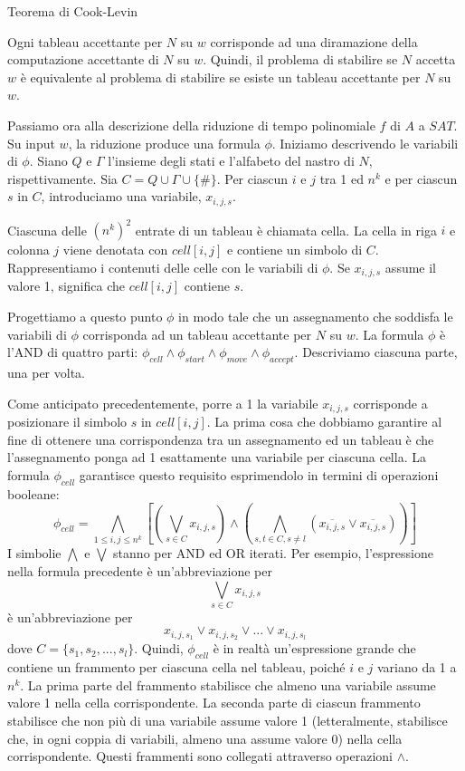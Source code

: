 \begin{Thm}{Teorema di Cook-Levin}{}
\begin{demonstration}
Ogni tableau accettante per $N$ su $w$ corrisponde ad una diramazione della computazione accettante di $N$ su $w$. Quindi, il problema di stabilire se $N$ accetta $w$ è equivalente al problema di stabilire se esiste un tableau accettante per $N$ su $w$.

Passiamo ora alla descrizione della riduzione di tempo polinomiale $f$ di $A$ a $SAT$. Su input $w$, la riduzione produce una formula $\phi$. Iniziamo descrivendo le variabili di $\phi$. Siano $Q$ e $\Gamma$ l'insieme degli stati e l'alfabeto del nastro di $N$, rispettivamente. Sia $C = Q\cup\Gamma\cup\{\#\}$. Per ciascun $i$ e $j$ tra 1 ed $n^k$ e per ciascun $s$ in $C$, introduciamo una variabile, $x_{i,j,s}$.

Ciascuna delle $(n ^ k) ^ 2$ entrate di un tableau è chiamata cella. La cella in riga $i$ e colonna $j$ viene denotata con $cell[i, j]$ e contiene un simbolo di $C$. Rappresentiamo i contenuti delle celle con le variabili di $\phi$. Se $x_{i,j,s}$ assume il valore 1, significa che $cell[i, j]$ contiene $s$.

Progettiamo a questo punto $\phi$ in modo tale che un assegnamento che soddisfa le variabili di $\phi$ corrisponda ad un tableau accettante per $N$ su $w$. La formula $\phi$ è l'AND di quattro parti: $\phi_{cell}\land\phi_{start}\land\phi_{move}\land\phi_{accept}$. Descriviamo ciascuna parte, una per volta.

Come anticipato precedentemente, porre a 1 la variabile $x_{i,j,s}$ corrisponde a posizionare il simbolo $s$ in $cell[i, j]$. La prima cosa che dobbiamo garantire al fine di ottenere una corrispondenza tra un assegnamento ed un tableau è che l'assegnamento ponga ad 1 esattamente una variabile per ciascuna cella. La formula $\phi_{cell}$ garantisce questo requisito esprimendolo in termini di operazioni booleane: 
\begin{equation*}
\phi_{cell} = \bigwedge_{1\leq i ,j\leq n^k} \left[\left(\bigvee_{s\in C} x_{i,j,s}\right)\land\left(\bigwedge_{s,t\in C, s\neq l} (\overline{x_{i,j,s}}\lor\overline{x_{i,j,s}})\right)\right]
\end{equation*}
I simbolie $\bigwedge$ e $\bigvee$ stanno per AND ed OR iterati. Per esempio, l'espressione nella formula precedente è un'abbreviazione per 
\begin{equation*}
    \bigvee_{s\in C}x_{i,j,s}
\end{equation*}
è un'abbreviazione per
\begin{equation*}
    x_{i,j,s_1}\lor x_{i,j,s_2} \lor...\lor x_{i,j,s_l}
\end{equation*}
dove $C=\{s_1, s_2, ..., s_l\}$. Quindi, $\phi_{cell}$ è in realtà un'espressione grande che contiene un frammento per ciascuna cella nel tableau, poiché $i$ e $j$ variano da 1 a $n ^ k$. La prima parte del frammento stabilisce che almeno una variabile assume valore 1 nella cella corrispondente. La seconda parte di ciascun frammento stabilisce che non più di una variabile assume valore 1 (letteralmente, stabilisce che, in ogni coppia di variabili, almeno una assume valore 0) nella cella corrispondente. Questi frammenti sono collegati attraverso operazioni $\land$.


\end{demonstration}
\end{Thm}
